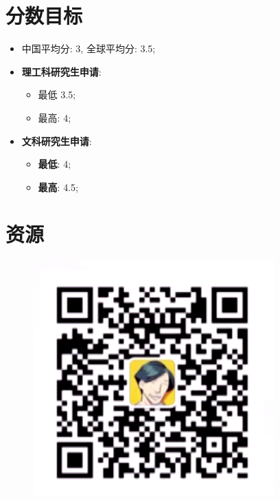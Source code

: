 \section{分数目标}

  \begin{itemize}
    \item 中国平均分: 3, 全球平均分: 3.5;
    \item \textbf{理工科研究生申请}:
    \begin{itemize}
      \item 最低 3.5;
      \item 最高: 4;
    \end{itemize}

    \item \textbf{文科研究生申请}:
    \begin{itemize}
      \item \textbf{最低}: 4;
      \item \textbf{最高}: 4.5;
    \end{itemize}
  \end{itemize}

\section{资源}

  \begin{figure}[H]
    \centering
    \includegraphics[width=0.5\columnwidth]{images/保罗主义.png}
  \end{figure}
